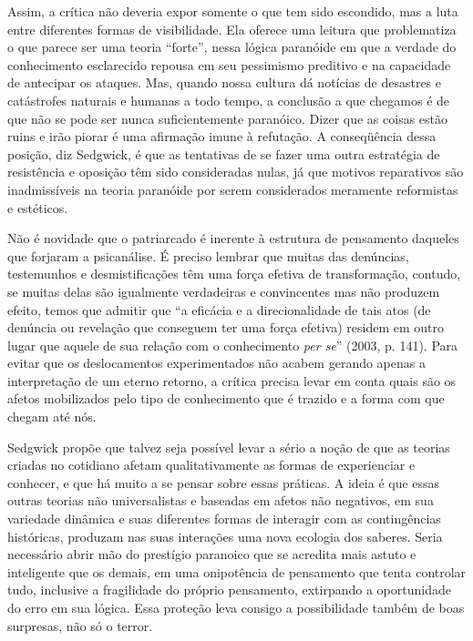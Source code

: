 Assim, a crítica não deveria expor somente o que tem sido escondido, mas
a luta entre diferentes formas de visibilidade. Ela oferece uma leitura
que problematiza o que parece ser uma teoria ``forte'', nessa lógica
paranóide em que a verdade do conhecimento esclarecido repousa em seu
pessimismo preditivo e na capacidade de antecipar os ataques. Mas,
quando nossa cultura dá notícias de desastres e catástrofes naturais e
humanas a todo tempo, a conclusão a que chegamos é de que não se pode
ser nunca suficientemente paranóico. Dizer que as coisas estão ruins e
irão piorar é uma afirmação imune à refutação. A conseqüência dessa
posição, diz Sedgwick, é que as tentativas de se fazer uma outra
estratégia de resistência e oposição têm sido consideradas nulas, já que
motivos reparativos são inadmissíveis na teoria paranóide por serem
considerados meramente reformistas e estéticos.

Não é novidade que o patriarcado é inerente à estrutura de pensamento
daqueles que forjaram a psicanálise. É preciso lembrar que muitas das
denúncias, testemunhos e desmistificações têm uma força efetiva de
transformação, contudo, se muitas delas são igualmente verdadeiras e
convincentes mas não produzem efeito, temos que admitir que ``a eficácia
e a direcionalidade de tais atos (de denúncia ou revelação que conseguem
ter uma força efetiva) residem em outro lugar que aquele de sua relação
com o conhecimento \emph{per se}'' (2003, p. 141). Para evitar que os
deslocamentos experimentados não acabem gerando apenas a interpretação
de um eterno retorno, a crítica precisa levar em conta quais são os
afetos mobilizados pelo tipo de conhecimento que é trazido e a forma com
que chegam até nós.

Sedgwick propõe que talvez seja possível levar a sério a noção de que as
teorias criadas no cotidiano afetam qualitativamente as formas de
experienciar e conhecer, e que há muito a se pensar sobre essas
práticas. A ideia é que essas outras teorias não universalistas e
baseadas em afetos não negativos, em sua variedade dinâmica e suas
diferentes formas de interagir com as contingências históricas, produzam
nas suas interações uma nova ecologia dos saberes. Seria necessário
abrir mão do prestígio paranoico que se acredita mais astuto e
inteligente que os demais, em uma onipotência de pensamento que tenta
controlar tudo, inclusive a fragilidade do próprio pensamento,
extirpando a oportunidade do erro em sua lógica. Essa proteção leva
consigo a possibilidade também de boas surpresas, não só o terror.

